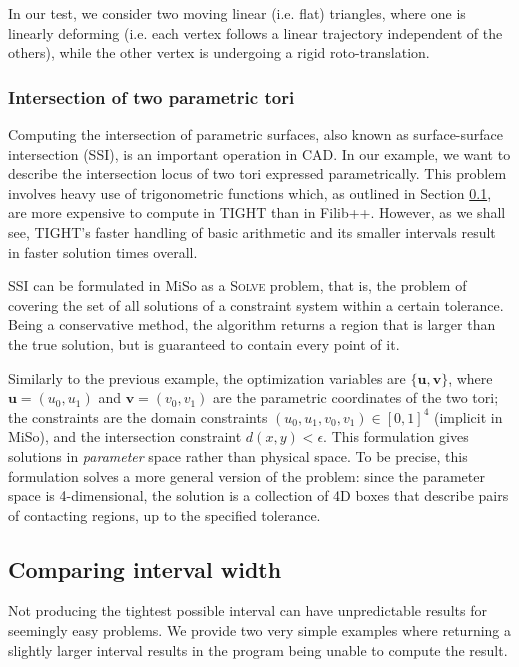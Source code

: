 In our test, we consider two moving linear (i.e. flat) triangles, where one is linearly deforming (i.e. each vertex follows a linear trajectory independent of the others), while the other vertex is undergoing a rigid roto-translation.

\FS{\dots}

\subsubsection{Intersection of two parametric tori}
Computing the intersection of parametric surfaces, also known as surface-surface intersection (SSI), is an important operation in CAD.
In our example, we want to describe the intersection locus of two tori expressed parametrically. This problem involves heavy use of trigonometric functions which, as outlined in Section \ref{}, are more expensive to compute in TIGHT than in Filib++.
However, as we shall see, TIGHT's faster handling of basic arithmetic and its smaller intervals result in faster solution times overall.

SSI can be formulated in MiSo as a \textsc{Solve} problem, that is, the problem of covering the set of all solutions of a constraint system within a certain tolerance.
Being a conservative method, the algorithm returns a region that is larger than the true solution, but is guaranteed to contain every point of it.

Similarly to the previous example, the optimization variables are $\{\mathbf{u}, \mathbf{v}\}$, where $\mathbf{u}=(u_0, u_1)$ and $\mathbf{v}=(v_0, v_1)$ are the parametric coordinates of the two tori;
the constraints are the domain constraints $(u_0,u_1,v_0,v_1)\in[0,1]^4$ (implicit in MiSo), and the intersection constraint $d(x,y)<\epsilon$.
This formulation gives solutions in \emph{parameter} space rather than physical space. To be precise, this formulation solves a more general version of the problem: since the parameter space is 4-dimensional, the solution is a collection of 4D boxes that describe pairs of contacting regions, up to the specified tolerance.

\FS{\dots}

\subsection{Comparing interval width}
Not producing the tightest possible interval can have unpredictable results for seemingly easy problems. We provide two very simple examples where returning a slightly larger interval results in the program being unable to compute the result.


